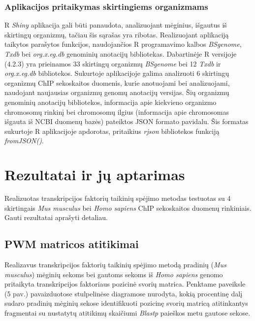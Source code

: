 \documentclass[12pt]{article}
\begin{document}
\subsubsection*{Aplikacijos pritaikymas skirtingiems organizmams}
R \emph{Shiny} aplikacija gali būti panaudota, analizuojant mėginius, išgautus
iš skirtingų or\-ga\-niz\-mų, tačiau šis sąrašas yra ribotas. Realizuojant
aplikaciją taikytos parašytos funkcijos, naudojančios R programavimo kalbos
\emph{BSgenome}, \emph{Txdb} bei \emph{org.x.eg.db} genominių anotacijų
bibliotekas. Dabartinėje R versijoje (4.2.3) yra prieinamos 33 skirtingų
organizmų \emph{BSgenome} bei 12 \emph{Txdb} ir \emph{org.x.eg.db} bibliotekos.
Sukurtoje aplikacijoje galima analizuoti 6 skirtingų organizmų ChIP sekoskaitos
duomenis, kurie anotuojami bei analizuojami, naudojant naujausias organizmų
genomų anotacijų versijas. Šių organizmų genominių anotacijų bibliotekos,
informacija apie kiekvieno organizmo chromosomų rinkinį bei chromosomų ilgius
(informacija apie chromosomas išgauta iš NCBI\cite{NCBI} duomenų bazės)
pateiktos JSON formato pavidalu. Šis formatas sukurtoje
R aplikacijoje apdorotas, pritaikius \emph{rjson}\cite{RJSON} bibliotekos
funkciją \emph{fromJSON()}.

\newpage


\section{Rezultatai ir jų aptarimas}
Realizuotas transkripcijos faktorių taikinių spėjimo metodas testuotas su 4
skirtingais \emph{Mus musculus} bei \emph{Homo sapiens} ChIP sekoskaitos
duomenų rinkiniais. Gauti rezultatai aprašyti detaliau.

\subsection{PWM matricos atitikimai}
Realizavus transkripcijos faktorių taikinių spėjimo metodą pradinių
(\emph{Mus musculus}) mėginių sekoms bei gautoms sekoms iš \emph{Homo sapiens}
genomo pritaikyta transkripcijos
faktoriaus pozicinė svorių matrica. Penktame paveiksle (5 pav.) pavaizduotose
stulpelinėse diagramose nurodyta, kokią procentinę dalį sudaro pradinių
mėginių sekose identifikuoti pozicinę svorių matricą atitinkantys fragmentai
su nustatytų atitikimų skaičiumi \emph{Blastp} paieškos metu gautose sekose.
\end{document}
